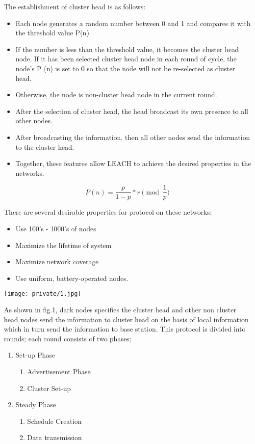 \documentclass[journal,transmag]{IEEEtran}
\begin{document}
The establishment of cluster head is as follows:

\begin{itemize}
  \item Each node generates a random number between 0 and 1 and compares it with the threshold value P(n).
  \item If the number is less than the threshold value, it becomes the cluster head node. If it has been selected cluster head node in each round of cycle, the node’s P (n) is set to 0 so that the node will not be re-selected as cluster head.
  \item Otherwise, the node is non-cluster head node in the current round.
  \item After the selection of cluster head, the head broadcast its own presence to all other nodes.
  \item After broadcasting the information, then all other nodes send the information to the cluster head.
  \item Together, these features allow LEACH to achieve the desired properties in the networks.
\end{itemize}

\[P(n) = \frac{p}{1-p} * r\pmod{\frac{1}{p}}\]

There are several desirable properties for protocol on these networks:
\begin{itemize}
  \item Use 100's - 1000's of nodes
  \item Maximize the lifetime of system
  \item Maximize network coverage
  \item Use uniform, battery-operated nodes.
\end{itemize}

\texttt{[image: private/1.jpg]}

As shown in fig.1, dark nodes specifies the cluster head and other non cluster head nodes send the information to cluster head on the basis of local information which in turn send the information to base station. This protocol is divided into rounds; each round consists of two phases;

\begin{enumerate}
  \item Set-up Phase
  \begin{enumerate}
    \item Advertisement Phase
    \item Cluster Set-up
  \end{enumerate}

  \item Steady Phase
  \begin{enumerate}
    \item Schedule Creation
    \item Data transmission
  \end{enumerate}
\end{enumerate}
\end{document}

